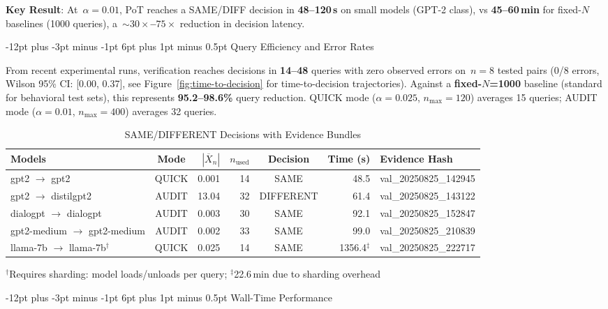 \documentclass[11pt]{article}
\makeatletter
\renewcommand\subsection{\@startsection{subsection}{2}{\z@}%
  {-12pt plus -3pt minus -1pt}%
  {6pt plus 1pt minus 0.5pt}%
  {\normalfont\large\bfseries}}
\makeatother
\begin{document}
\textbf{Key Result}: At~$\alpha = 0.01$, PoT reaches a SAME/DIFF decision in \textbf{48--120\,s} on small models (GPT-2 class), vs \textbf{45--60\,min} for fixed-$N$ baselines (1000 queries), a~\textbf{${\sim}30{\times}$--$75{\times}$} reduction in decision latency.

\subsection{Query Efficiency and Error Rates}

From recent experimental runs, verification reaches decisions in \textbf{14--48} queries with zero observed errors on~$n=8$ tested pairs (0/8 errors, Wilson 95\% CI: [0.00, 0.37], see Figure~\ref{fig:time-to-decision} for time-to-decision trajectories). Against a \textbf{fixed-$N$=1000} baseline (standard for behavioral test sets), this represents \textbf{95.2--98.6\%} query reduction. QUICK mode ($\alpha=0.025$, $n_{\max}=120$) averages 15 queries; AUDIT mode ($\alpha=0.01$, $n_{\max}=400$) averages 32 queries.

\begin{table}[t]
\centering
\caption{SAME/DIFFERENT Decisions with Evidence Bundles}
\label{tab:decisions}
\small
\begin{tabular}{l c r r c r l}
\toprule
\textbf{Models} & \textbf{Mode} & \textbf{$|\overline{X}_n|$} & \textbf{$n_{\text{used}}$} & \textbf{Decision} & \textbf{Time (s)} & \textbf{Evidence Hash} \\
\midrule
gpt2 $\to$ gpt2 & QUICK & 0.001 & 14 & SAME & 48.5 & val\_20250825\_142945 \\
gpt2 $\to$ distilgpt2 & AUDIT & 13.04 & 32 & DIFFERENT & 61.4 & val\_20250825\_143122 \\
dialogpt $\to$ dialogpt & AUDIT & 0.003 & 30 & SAME & 92.1 & val\_20250825\_152847 \\
gpt2-medium $\to$ gpt2-medium & AUDIT & 0.002 & 33 & SAME & 99.0 & val\_20250825\_210839 \\
llama-7b $\to$ llama-7b$^{\dagger}$ & QUICK & 0.025 & 14 & SAME & 1356.4$^{\ddagger}$ & val\_20250825\_222717 \\
\bottomrule
\end{tabular}

\vspace{3pt}
\footnotesize{$^{\dagger}$Requires sharding: model loads/unloads per query; $^{\ddagger}$22.6\,min due to sharding overhead}
\end{table}

\subsection{Wall-Time Performance}
\end{document}
